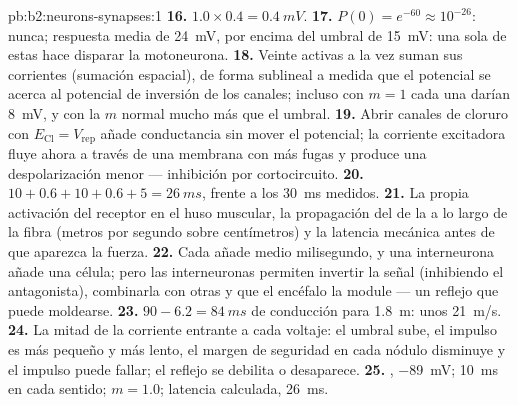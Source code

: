 \begin{solution}{pb:b2:neurons-synapses:1}
\textbf{16.} $1.0\times 0.4 = \qty{0.4}{mV}$.
\textbf{17.} $P(0) = e^{-60} \approx 10^{-26}$: nunca; respuesta media de
\qty{24}{mV}, por encima del umbral de \qty{15}{mV}: una sola de estas
 hace disparar la motoneurona.
\textbf{18.} Veinte  activas a la vez suman sus corrientes
(sumación espacial), de forma sublineal a medida que el potencial se
acerca al potencial de inversión de los canales; incluso con $m = 1$ cada
una darían \qty{8}{mV}, y con la $m$ normal mucho más que el umbral.
\textbf{19.} Abrir canales de cloruro con $E_{\mathrm{Cl}} = V_{\text{rep}}$
añade conductancia sin mover el potencial; la corriente excitadora fluye
ahora a través de una membrana con más fugas y produce una
despolarización menor --- inhibición por cortocircuito.
\textbf{20.} $10 + 0.6 + 10 + 0.6 + 5 = \qty{26}{ms}$, frente a los
\qty{30}{ms} medidos.
\textbf{21.} La propia activación del receptor en el huso muscular, la
propagación del  de la  a lo largo de la
fibra (metros por segundo sobre centímetros) y la latencia mecánica antes
de que aparezca la fuerza.
\textbf{22.} Cada  añade medio milisegundo, y una interneurona
añade una célula; pero las interneuronas permiten invertir la señal
(inhibiendo el antagonista), combinarla con otras y que el encéfalo la
module --- un reflejo que puede moldearse.
\textbf{23.} $90 - 6.2 = \qty{84}{ms}$ de conducción para \qty{1.8}{m}:
unos \qty{21}{m/s}.
\textbf{24.} La mitad de la corriente entrante a cada voltaje: el umbral
sube, el impulso es más pequeño y más lento, el margen de seguridad en cada
nódulo disminuye y el impulso puede fallar; el reflejo se debilita o
desaparece.
\textbf{25.} , \qty{-89}{mV}; \qty{10}{ms} en cada
sentido; $m = 1.0$; latencia calculada, \qty{26}{ms}.
\end{solution}
